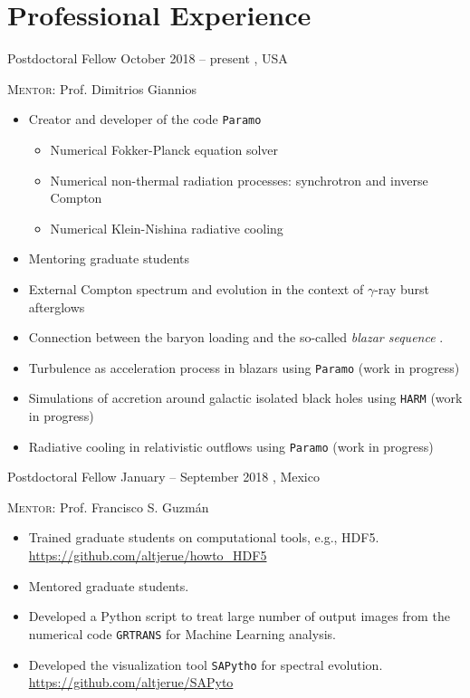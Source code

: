 \section{Professional Experience}

\cventry{}%
{\DPA}%
{Postdoctoral Fellow}%
{October 2018 -- present}%
{\Purdue, USA}%
{\textsc{Mentor}: Prof. Dimitrios Giannios%
  \begin{itemize}
    \item Creator and developer of the code \texttt{Paramo}
    \begin{itemize}
      \item Numerical Fokker-Planck equation solver
      \item Numerical non-thermal radiation processes: synchrotron and inverse Compton
      \item Numerical Klein-Nishina radiative cooling
    \end{itemize}
    \item Mentoring graduate students
    \item External Compton spectrum and evolution in the context of $\gamma$-ray burst afterglows \cite{Zhang:2020ch}
    \item Connection between the baryon loading and the so-called \emph{blazar sequence} \cite{RuedaBecerril:2020ha}.
    \item Turbulence as acceleration process in blazars using \texttt{Paramo} (work in progress)
    \item Simulations of accretion around galactic isolated black holes using \texttt{HARM} (work in progress)
    \item Radiative cooling in relativistic outflows using \texttt{Paramo} (work in progress)
  \end{itemize}
}
\cventry{}%
{\IFMes}%
{Postdoctoral Fellow}%
{\hspace{-30ex}January -- September 2018}%
{\UMSNHes, Mexico}%
{\textsc{Mentor}: Prof. Francisco S. Guzmán
  \begin{itemize}
    \item Trained graduate students on computational tools, e.g., HDF5. \url{https://github.com/altjerue/howto_HDF5}
    \item Mentored graduate students.
    \item Developed a Python script to treat large number of output images from the numerical code \texttt{GRTRANS} for Machine Learning analysis.
    \item Developed the visualization tool \texttt{SAPytho} for spectral evolution. \url{https://github.com/altjerue/SAPyto}
  \end{itemize}
}
